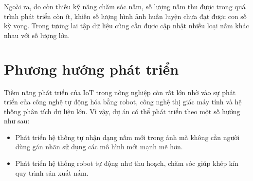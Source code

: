 Ngoài ra, do còn thiếu kỹ năng chăm sóc nấm, số lượng nấm thu được trong quá trình phát triển còn ít, khiến số lượng hình ảnh huấn luyện chưa đạt được con số kỳ vọng. Trong tương lai tập dữ liệu cũng cần được cập nhật nhiều loại nấm khác nhau với số lượng lớn.

\section*{Phương hướng phát triển}

Tiềm năng phát triển của IoT trong nông nghiệp còn rất lớn nhờ vào sự phát triển của công nghệ tự động hóa bằng robot, công nghệ thị giác máy tính và hệ thống phân tích dữ liệu lớn. Vì vậy, dự án có thể phát triển theo một số hướng như sau:
\begin{itemize}
	\item Phát triển hệ thống tự nhận dạng nấm mới trong ảnh mà không cần người dùng gán nhãn sử dụng các mô hình mới mạnh mẽ hơn.
	\item Phát triển hệ thống robot tự động như thu hoạch, chăm sóc giúp khép kín quy trình sản xuất nấm.
\end{itemize}







